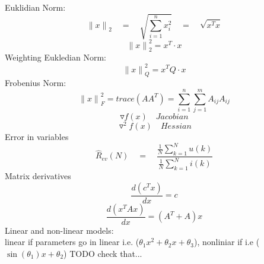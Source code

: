 \begin{tcolorbox}[colback=red!5!white,colframe=red!75!black,title=Introduction]
Euklidian Norm: 
\begin{equation*}
{ \parallel x\parallel  }_{ 2 }\quad =\quad \sqrt { \sum _{ i=1 }^{ n }{ { x }_{ i }^{ 2 } }  } \quad =\quad \sqrt { { x }^{ T }x }
\end{equation*}
\begin{equation*}
{\parallel x\parallel  }_{ 2 }^{ 2 } = x^T\cdot x
\end{equation*}
Weighting Eukledian Norm:
\begin{equation*}
{\parallel x\parallel  }_{ Q }^{ 2 } = x^TQ \cdot x
\end{equation*}
Frobenius Norm:
\begin{equation*}
{\parallel x\parallel  }_{ F }^{ 2 } = trace(A{ A }^{ T })=\sum _{ i=1 }^{ n } \sum _{ j=1 }^{ m }{ { A }_{ ij }{ A }_{ ij } } 
\end{equation*}
\begin{equation*}
\triangledown f(x) \quad Jacobian
\end{equation*}
\begin{equation*}
{ \triangledown  }^{ 2 }f(x)\quad Hessian
\end{equation*}
\tcblower
Error in variables
\begin{equation*}
\hat { R } _{ ev }(N)\quad =\quad \frac { \frac { 1 }{ N } \sum _{ k=1 }^{ N }{ u(k) }  }{ \frac { 1 }{ N } \sum _{ k=1 }^{ N }{ i(k) }  }
\end{equation*}
Matrix derivatives
\begin{equation*}
\frac{d(c^Tx)}{dx} = c
\end{equation*} 
\begin{equation*}
\frac{d(x^TAx)}{dx} = (A^T + A)x
\end{equation*} 
Linear and non-linear models:\\
linear if parameters go in linear i.e. ($\theta_1 x^2 + \theta_2 x + \theta_3$), nonliniar if i.e ($\sin(\theta_1)x + \theta_2$) TODO check that...


\end{tcolorbox}
